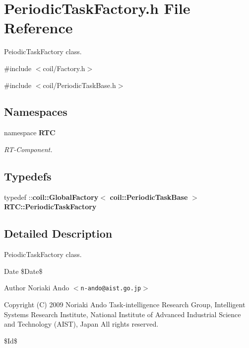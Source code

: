 \section{PeriodicTaskFactory.h File Reference}
\label{PeriodicTaskFactory_8h}


PeiodicTaskFactory class.  


{\ttfamily \#include $<$coil/Factory.h$>$}\par
{\ttfamily \#include $<$coil/PeriodicTaskBase.h$>$}\par
\subsection*{Namespaces}
\begin{DoxyCompactItemize}
\item 
namespace {\bf RTC}


\begin{DoxyCompactList}\small\item\em RT-\/Component. \item\end{DoxyCompactList}

\end{DoxyCompactItemize}
\subsection*{Typedefs}
\begin{DoxyCompactItemize}
\item 
typedef ::{\bf coil::GlobalFactory}$<$ {\bf coil::PeriodicTaskBase} $>$ {\bf RTC::PeriodicTaskFactory}
\end{DoxyCompactItemize}


\subsection{Detailed Description}
PeiodicTaskFactory class. \begin{DoxyDate}{Date}
\$Date\$ 
\end{DoxyDate}
\begin{DoxyAuthor}{Author}
Noriaki Ando $<${\tt n-\/ando@aist.go.jp}$>$
\end{DoxyAuthor}
Copyright (C) 2009 Noriaki Ando Task-\/intelligence Research Group, Intelligent Systems Research Institute, National Institute of Advanced Industrial Science and Technology (AIST), Japan All rights reserved.

\$Id\$ 